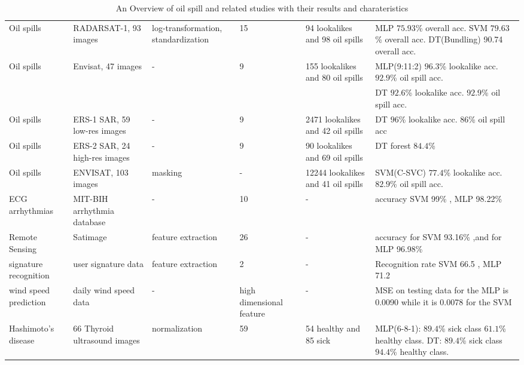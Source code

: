 \begin{table*}[t]
\begin{adjustbox}{width=\textwidth,totalheight=\textheight,keepaspectratio}
\begin{tabular}{*{6}{l}}
    Oil spills\cite{Xu201414} &  RADARSAT-1, 93 images & log-transformation, standardization & 15 & 94 lookalikes and 98 oil spills & MLP $75.93$\% overall acc. SVM $79.63$\% overall acc. DT(Bundling) 90.74 overall acc.\\
    
    Oil spills\cite{Mera201472} &  Envisat, 47 images & - & 9 & 155 lookalikes and 80 oil spills & MLP(9:11:2) $96.3$\% lookalike acc. $92.9$\% oil spill acc. \\
    & & & & & DT $92.6$\% lookalike acc. $92.9$\% oil spill acc. \\
    
    Oil spills\cite{Delfrate1996} &  ERS-1 SAR, 59 low-res images & - & 9 & 2471 lookalikes and 42 oil spills & DT $96$\% lookalike acc. $86$\% oil spill acc\\
    
    Oil spills\cite{Topouzelis201268} &  ERS-2 SAR, 24 high-res images & - & 9 & 90 lookalikes and 69 oil spills & DT forest $84.4$\%\\ 
    
    Oil spills\cite{brekke2008classifiers} & ENVISAT, 103 images & masking & - & 12244 lookalikes and 41 oil spills & SVM(C-SVC) $77.4$\% lookalike acc. $82.9$\% oil spill acc.\\

    ECG arrhythmias\cite{Moavenian20103088} & MIT-BIH arrhythmia database & - & 10 & - & accuracy SVM 99\% , MLP 98.22\% \\

    Remote Sensing\cite{Zanaty2012177} & Satimage & feature extraction & 26& - & accuracy for SVM 93.16\% ,and for MLP 96.98\%\\
    
    signature recognition\cite{FriasMartinez2006693} & user signature data &feature extraction& 2 & - & Recognition rate SVM 66.5  , MLP 71.2\\
    wind speed prediction\cite{Mohandes2004939}& daily wind speed data & - &high dimensional feature & - & MSE on testing data for the MLP is 0.0090 while it is 0.0078 for the SVM\\
    
    Hashimoto's disease\cite{Omiotek201340} &  66 Thyroid ultrasound images & normalization & 59 & 54 healthy and 85 sick & MLP(6-8-1): $89.4$\% sick class $61.1$\% healthy class. DT: $89.4$\% sick class $94.4$\% healthy class. \\
    
    \bottomrule[1.5pt]
    
\end{tabular}
\end{adjustbox}
\caption{An Overview of oil spill and related studies with their results and charateristics}
\label{fig:table}
\end{table*}

